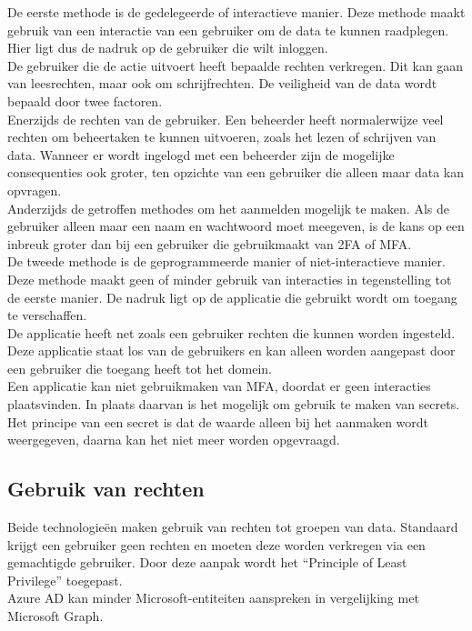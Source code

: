 De eerste methode is de gedelegeerde of interactieve manier. Deze methode maakt gebruik van een interactie van een gebruiker om de data te kunnen raadplegen. Hier ligt dus de nadruk op de gebruiker die wilt inloggen. \\

De gebruiker die de actie uitvoert heeft bepaalde rechten verkregen. Dit kan gaan van leesrechten, maar ook om schrijfrechten. De veiligheid van de data wordt bepaald door twee factoren. \\

Enerzijds de rechten van de gebruiker. Een beheerder heeft normalerwijze veel rechten om beheertaken te kunnen uitvoeren, zoals het lezen of schrijven van data. Wanneer er wordt ingelogd met een beheerder zijn de mogelijke consequenties ook groter, ten opzichte van een gebruiker die alleen maar data kan opvragen. \\ 

Anderzijds de getroffen methodes om het aanmelden mogelijk te maken. Als de gebruiker alleen maar een naam en wachtwoord moet meegeven, is de kans op een inbreuk groter dan bij een gebruiker die gebruikmaakt van \ac{2FA} of \Ac{MFA}. \\

De tweede methode is de geprogrammeerde manier of niet-interactieve manier. Deze methode maakt geen of minder gebruik van interacties in tegenstelling tot de eerste manier. De nadruk ligt op de applicatie die gebruikt wordt om toegang te verschaffen. \\

De applicatie heeft net zoals een gebruiker rechten die kunnen worden ingesteld. Deze applicatie staat los van de gebruikers en kan alleen worden aangepast door een gebruiker die toegang heeft tot het domein. \\

Een applicatie kan niet gebruikmaken van \ac{MFA}, doordat er geen interacties plaatsvinden. In plaats daarvan is het mogelijk om gebruik te maken van secrets. Het principe van een secret is dat de waarde alleen bij het aanmaken wordt weergegeven, daarna kan het niet meer worden opgevraagd.

\subsection{Gebruik van rechten}



Beide technologieën maken gebruik van rechten tot groepen van data. Standaard krijgt een gebruiker geen rechten en moeten deze worden verkregen via een gemachtigde gebruiker. Door deze aanpak wordt het “Principle of Least Privilege” toegepast. \\

Azure \ac{AD} kan minder Microsoft-entiteiten aanspreken in vergelijking met Microsoft Graph. 